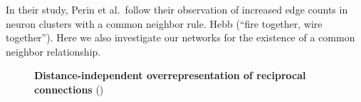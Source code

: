 In their study, Perin et al.\ follow their observation of increased edge
counts in neuron clusters with a common neighbor rule. Hebb
(\enquote{fire together, wire together}). Here we also investigate our
networks for the existence of a common neighbor relationship. 



\begin{figure}[htp]
  \centering
  \vfill
  \vspace{0.2cm}
  \captionsetup{skip=7pt}
  \caption{\textbf{Distance-independent overrepresentation of
      reciprocal connections}  ()}
  \label{fig:cm_rule}
\end{figure}








